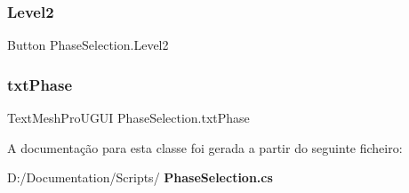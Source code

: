 \subsubsection{Level2}
{\footnotesize\ttfamily Button Phase\+Selection.\+Level2}

\mbox{\label{class_phase_selection_a5032e170f74d8f18a0c15e1ab8fa2840}} 
\subsubsection{txtPhase}
{\footnotesize\ttfamily Text\+Mesh\+Pro\+U\+G\+UI Phase\+Selection.\+txt\+Phase}



A documentação para esta classe foi gerada a partir do seguinte ficheiro\+:\begin{DoxyCompactItemize}
\item 
D\+:/\+Documentation/\+Scripts/\textbf{ Phase\+Selection.\+cs}\end{DoxyCompactItemize}
